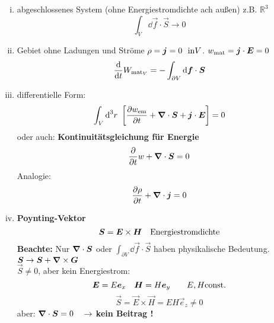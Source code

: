 \begin{enumerate}[i)]
	\item abgeschlossenes System (ohne Energiestromdichte ach außen) z.B. $ \mathbb{R}^3 $
	\begin{equation*}
	\int_V \dd \vec{f} \cdot \vec{S} \rightarrow 0
	\end{equation*}
	\item Gebiet ohne Ladungen und Ströme $ \rho = \bm{j} = 0 \ \ \textrm{in} V $. $ w_{\textrm{mat}} = \bm{j} \cdot \bm{E} = 0 $
	\begin{equation*}
	\frac{\textrm{d} }{\textrm{d} t} W_{\textrm{mat}_V} = - \int_{\partial V} \textrm{d} \bm{f} \cdot \bm{S}
	\end{equation*}
	\item differentielle Form:
	\begin{equation*}
	\int_V \textrm{d}^3 r \ \left[\frac{\partial w_{\textrm{em}}}{\partial t} + \bm{\nabla} \cdot \bm{S} + \bm{j} \cdot \bm{E}\right] = 0
	\end{equation*}
	oder auch: \textbf{Kontinuitätsgleichung für Energie}
	\begin{equation*}
	\frac{\partial }{\partial t} w + \bm{\nabla} \cdot \bm{S} = 0
	\end{equation*}
	Analogie:
	\begin{equation*}
	\frac{\partial \rho}{\partial t} + \bm{\nabla} \cdot \bm{j} = 0
	\end{equation*}
	\item \textbf{Poynting-Vektor}
	\begin{equation*}
	\bm{S} = \bm{E} \times \bm{H} \quad \textrm{Energiestromdichte}
	\end{equation*}
	\textbf{Beachte:} Nur $ \bm{\nabla} \cdot \bm{S} $ oder $ \int_{\partial V} \dd \vec{f} \cdot \vec{S} $ haben physikalische Bedeutung.\\[5pt]
	$ \bm{S} \to \bm{S} + \bm{\nabla} \times \bm{G} $\\
	$ \vec{S} \neq 0 $, aber kein Energiestrom:
	\begin{equation*}
	\bm{E} = E \bm{e}_x \quad \bm{H} = H \bm{e}_y \qquad E,H \textrm{const.}
	\end{equation*}
	\begin{equation*}
	\vec{S} = \vec{E} \times \vec{H} = E H \vec{e}_z \neq 0
	\end{equation*}
	aber: $ \bm{\nabla} \cdot \bm{S} = 0  \quad \rightarrow $ \textbf{kein Beitrag !}
\end{enumerate}
